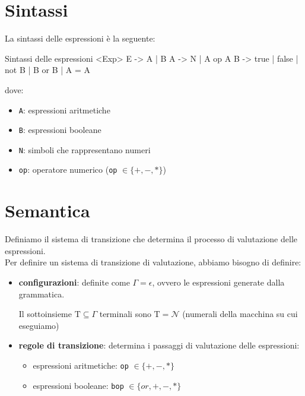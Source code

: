 \section{Sintassi}
La sintassi delle espressioni è la seguente:
\begin{bnfcode}{Sintassi delle espressioni}
    <Exp>
    E -> A | B
    A -> N | A op A
    B -> true | false | not B | B or B | A = A
\end{bnfcode}

dove:
\begin{itemize}[label=$\triangleright$, itemsep=\smallskipamount]
    \item \texttt{A}: espressioni aritmetiche
    \item \texttt{B}: espressioni booleane
    \item \texttt{N}: simboli che rappresentano numeri
    \item \texttt{op}: operatore numerico (\texttt{op} $\in \{+,-,*\}$)
\end{itemize}

\section{Semantica}
Definiamo il sistema di transizione che determina il processo di valutazione delle espressioni.\\[0.2ex]
Per definire un sistema di transizione di valutazione, abbiamo bisogno di definire:
\begin{itemize}[label=$\triangleright$, itemsep=\medskipamount]
    \item \textbf{configurazioni}: definite come $\Gamma = \epsilon$, ovvero le espressioni generate dalla grammatica.
    
    Il sottoinsieme $\mathrm{T} \subseteq \Gamma$ terminali sono $\mathrm{T} = \mathcal{N}$ (numerali della macchina su cui eseguiamo)
    \item \textbf{regole di transizione}: determina i passaggi di valutazione delle espressioni:
    \begin{itemize}[label=$\diamond$, itemsep=\medskipamount]
        \item espressioni aritmetiche: \texttt{op} $\in \{+,-,*\}$
        \item espressioni booleane: \texttt{bop} $\in \{or,+,-,*\}$
    \end{itemize}
\end{itemize}

